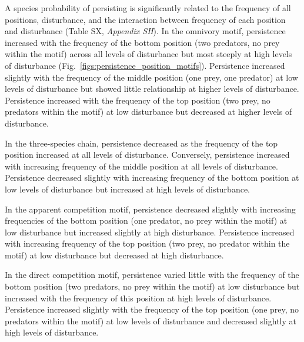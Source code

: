 \documentclass[12pt]{article}
\begin{document}
\begin{spacing}{2.0}
        A species probability of persisting is significantly related to the frequency of all positions, disturbance, and the interaction between frequency of each position and disturbance (Table SX, \emph{Appendix SH}).
        In the omnivory motif, persistence increased with the frequency of the bottom position (two predators, no prey within the motif) across all levels of disturbance but most steeply at high levels of disturbance (Fig.~\ref{figs:persistence_position_motifs}).
        Persistence increased slightly with the frequency of the middle position (one prey, one predator) at low levels of disturbance but showed little relationship at higher levels of disturbance.
        Persistence increased with the frequency of the top position (two prey, no predators within the motif) at low disturbance but decreased at higher levels of disturbance.
        
        In the three-species chain, persistence decreased as the frequency of the top position increased at all levels of disturbance.
        Conversely, persistence increased with increasing frequency of the middle position at all levels of disturbance.
        Persistence decreased slightly with increasing frequency of the bottom position at low levels of disturbance but increased at high levels of disturbance.
        
        In the apparent competition motif, persistence decreased slightly with increasing frequencies of the bottom position (one predator, no prey within the motif) at low disturbance but increased slightly at high disturbance.
        Persistence increased with increasing frequency of the top position (two prey, no predator within the motif) at low disturbance but decreased at high disturbance.
        
        In the direct competition motif, persistence varied little with the frequency of the bottom position (two predators, no prey within the motif) at low disturbance but increased with the frequency of this position at high levels of disturbance.
        Persistence increased slightly with the frequency of the top position (one prey, no predators within the motif) at low levels of disturbance and decreased slightly at high levels of disturbance.
        


\end{spacing}
\end{document}
